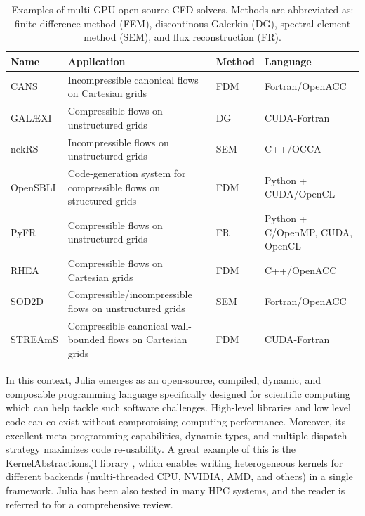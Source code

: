 \documentclass[final,3p,times]{elsarticle}
\begin{document}
\begin{table}[!ht]
\hspace{-1.5cm}
\begin{tabular}{ l  l  l  l}
    \hline
    \multicolumn{1}{l}{\textbf{Name}} & \multicolumn{1}{l}{\textbf{Application}} & \multicolumn{1}{l}{\textbf{Method}} & \multicolumn{1}{l}{\textbf{Language}} \\
    \hline\hline
    CANS \cite{Costa2018} & Incompressible canonical flows on Cartesian grids & FDM & Fortran/OpenACC \\
    GAL{\AE}XI \cite{Kempf2024} & Compressible flows on unstructured grids & DG & CUDA-Fortran \\
    nekRS \cite{Fischer2022} & Incompressible flows on unstructured grids & SEM & C++/OCCA \\
    OpenSBLI \cite{Lusher2021} & Code-generation system for compressible flows on structured grids & FDM & Python + CUDA/OpenCL \\
    PyFR \cite{Witherden2015} & Compressible flows on unstructured grids & FR & Python + C/OpenMP, CUDA, OpenCL \\
    RHEA \cite{Jofre2023} & Compressible flows on Cartesian grids & FDM & C++/OpenACC \\
    SOD2D \cite{Gasparino2024} & Compressible/incompressible flows on unstructured grids & SEM & Fortran/OpenACC \\
    STREAmS \cite{Bernardini2021} & Compressible canonical wall-bounded flows on Cartesian grids & FDM & CUDA-Fortran \\
    \hline
\end{tabular}
\caption{Examples of multi-GPU open-source CFD solvers. Methods are abbreviated as: finite difference method (FEM), discontinous Galerkin (DG), spectral element method (SEM), and flux reconstruction (FR).}\label{tab:solvers}
\end{table}

In this context, Julia \cite{Bezanson2017} emerges as an open-source, compiled, dynamic, and composable programming language specifically designed for scientific computing which can help tackle such software challenges. High-level libraries and low level code can co-exist without compromising computing performance. Moreover, its excellent meta-programming capabilities, dynamic types, and multiple-dispatch strategy maximizes code re-usability. A great example of this is the KernelAbstractions.jl library \cite{Churavy2023}, which enables writing heterogeneous kernels for different backends (multi-threaded CPU, NVIDIA, AMD, and others) in a single framework.
Julia has been also tested in many HPC systems, and the reader is referred to \cite{Churavy2022} for a comprehensive review.
\end{document}
